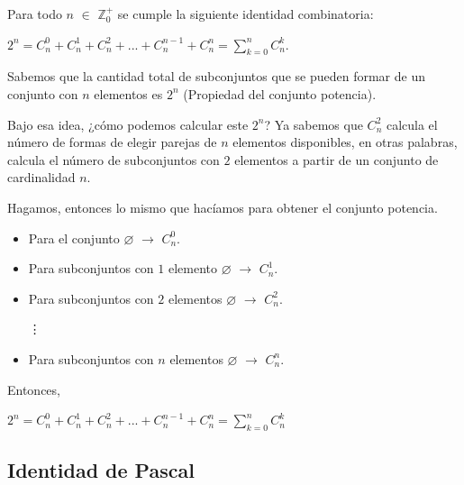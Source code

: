 \documentclass[12pt]{article}
\begin{document}
\begin{teorema}
    Para todo $n$ $\in$ $\mathbb{Z}^{+}_{0}$ se cumple la siguiente identidad combinatoria:

    \begin{center}
        $2^n = C^{0}_{n} + C^{1}_{n} + C^{2}_{n} + ... + C^{n-1}_{n} + C^{n}_{n} = \displaystyle\sum_{k=0}^{n} C^{k}_{n}$.
    \end{center}
\end{teorema}

\begin{demostracion}
    Sabemos que la cantidad total de subconjuntos que se pueden formar de un conjunto con $n$ elementos es $2^n$ (Propiedad del conjunto potencia).

    Bajo esa idea, ¿cómo podemos calcular este $2^n$? Ya sabemos que $C^{2}_{n}$ calcula el número de formas de elegir parejas de $n$ elementos disponibles, en otras palabras, calcula el número de subconjuntos con $2$ elementos a partir de un conjunto de cardinalidad $n$.

    Hagamos, entonces lo mismo que hacíamos para obtener el conjunto potencia.

    \begin{itemize}
        \item Para el conjunto $\varnothing$ $\rightarrow$ $C^{0}_{n}$.
        \item Para subconjuntos con $1$ elemento $\varnothing$ $\rightarrow$ $C^{1}_{n}$.
        \item Para subconjuntos con $2$ elementos $\varnothing$ $\rightarrow$ $C^{2}_{n}$.
        
        \qquad \qquad \qquad \qquad \quad \vdots
        
        \item Para subconjuntos con $n$ elementos $\varnothing$ $\rightarrow$ $C^{n}_{n}$.
    \end{itemize}

    Entonces,

    \begin{center}
        $2^n = C^{0}_{n} + C^{1}_{n} + C^{2}_{n} + ... + C^{n-1}_{n} + C^{n}_{n} = \displaystyle\sum_{k=0}^{n} C^{k}_{n}$
    \end{center}
\end{demostracion}

\subsection{Identidad de Pascal}
\end{document}
